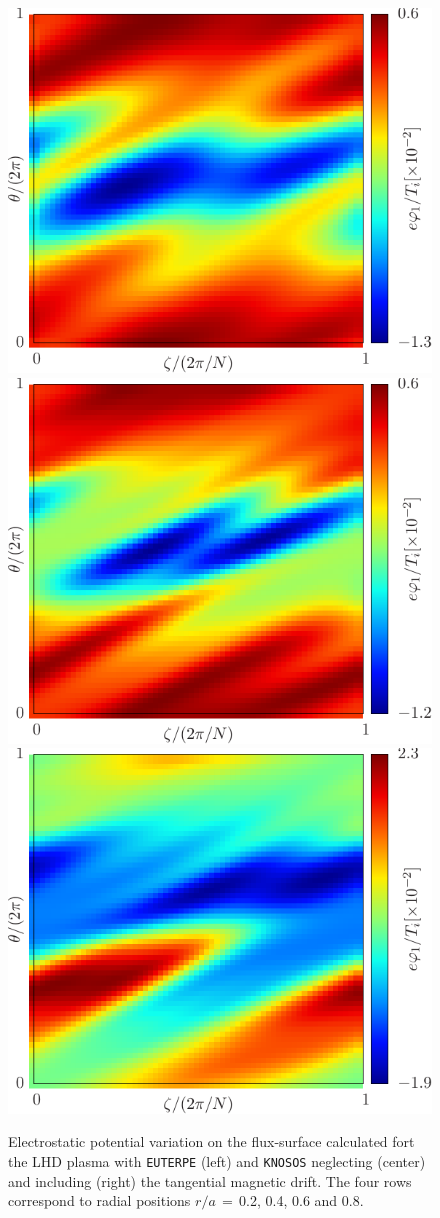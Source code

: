 \begin{figure}
\begin{center}
\

\includegraphics[width=0.3\columnwidth,angle=0]{figures/euterpeAIII08}
\includegraphics[width=0.3\columnwidth,angle=0]{figures/knososeutAIII08}
\includegraphics[width=0.3\columnwidth,angle=0]{figures/knososAIII08}
\end{center}
\caption{Electrostatic potential variation on the flux-surface calculated fort the LHD plasma with \texttt{EUTERPE} (left) and \texttt{KNOSOS} neglecting (center) and including (right) the tangential magnetic drift. The four rows correspond to radial positions $r/a\,=\,$0.2, 0.4, 0.6 and 0.8.}
\label{FIG_PHI1LHD}
\end{figure}

